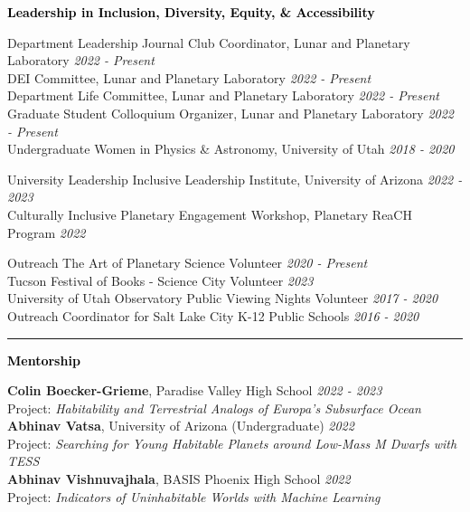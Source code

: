 \documentclass{resume} %
\newcommand{\mystrut}{\rule[-.3\baselineskip]{0pt}{\baselineskip}}
\newcommand{\cvline}[1]{\vspace*{\dimexpr-\parskip-0.3\baselineskip}\noindent\rule{\textwidth}{0.4pt}\vspace*{\dimexpr-0.3\parskip-0\baselineskip}}
\renewenvironment{rSection}[1]{\mystrut{\textcolor{black}{{\large{\textbf{#1}}}}}
\vspace{-5pt} %
\begin{list}{}{
\setlength{\leftmargin}{0em}
}
\item[]
}{
\end{list}
}
\begin{document}
\begin{rSection}{Leadership in Inclusion, Diversity, Equity, \& Accessibility} 
\begin{rSubsection}{Department Leadership}{}{}{}
{Journal Club Coordinator, Lunar and Planetary Laboratory \hfill {\em 2022 - Present}}\\
{DEI Committee, Lunar and Planetary Laboratory \hfill {\em 2022 - Present}}\\
{Department Life Committee, Lunar and Planetary Laboratory \hfill {\em 2022 - Present}}\\
{Graduate Student Colloquium Organizer, Lunar and Planetary Laboratory \hfill {\em 2022 - Present}}\\
{Undergraduate Women in Physics \& Astronomy, University of Utah \hfill {\em 2018 - 2020}}
\end{rSubsection}
\begin{rSubsection}{University Leadership}{}{}{}
{Inclusive Leadership Institute, University of Arizona \hfill {\em 2022 - 2023}}\\
{Culturally Inclusive Planetary Engagement Workshop, Planetary ReaCH Program \hfill {\em 2022}}
\end{rSubsection}
\begin{rSubsection}{Outreach}{}{}{}
{The Art of Planetary Science Volunteer \hfill {\em 2020 - Present}}\\
{Tucson Festival of Books - Science City Volunteer \hfill {\em 2023}}\\
{University of Utah Observatory Public Viewing Nights Volunteer \hfill {\em 2017 - 2020}}\\
{Outreach Coordinator for Salt Lake City K-12 Public Schools \hfill {\em 2016 - 2020}}
\end{rSubsection}
\vspace{0.5em}
\end{rSection}
\cvline{}

\begin{rSection}{Mentorship} 
{\bf Colin Boecker-Grieme}, Paradise Valley High School \hfill {\em 2022 - 2023} \\
{Project: \textit{Habitability and Terrestrial Analogs of Europa's Subsurface Ocean}}\\
{\bf Abhinav Vatsa}, University of Arizona (Undergraduate) \hfill {\em 2022} \\
{Project: \textit{Searching for Young Habitable Planets around Low-Mass M Dwarfs with TESS}}\\
{\bf Abhinav Vishnuvajhala}, BASIS Phoenix High School \hfill {\em 2022} \\
{Project: \textit{Indicators of Uninhabitable Worlds with Machine Learning}}
\end{rSection}
\end{document}
